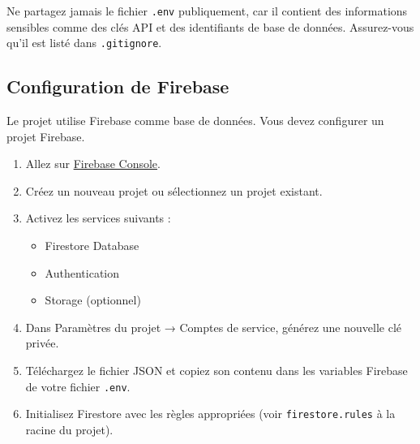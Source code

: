 \documentclass[12pt, a4paper]{article}
\begin{document}
\begin{warningbox}
Ne partagez jamais le fichier \texttt{.env} publiquement, car il contient des informations sensibles comme des clés API et des identifiants de base de données. Assurez-vous qu'il est listé dans \texttt{.gitignore}.
\end{warningbox}

\subsection{Configuration de Firebase}
\begin{stepbox}
Le projet utilise Firebase comme base de données. Vous devez configurer un projet Firebase.

\begin{enumerate}
  \item Allez sur \href{https://console.firebase.google.com/}{Firebase Console}.
  \item Créez un nouveau projet ou sélectionnez un projet existant.
  \item Activez les services suivants :
  \begin{itemize}
    \item Firestore Database
    \item Authentication
    \item Storage (optionnel)
  \end{itemize}
  \item Dans Paramètres du projet → Comptes de service, générez une nouvelle clé privée.
  \item Téléchargez le fichier JSON et copiez son contenu dans les variables Firebase de votre fichier \texttt{.env}.
  \item Initialisez Firestore avec les règles appropriées (voir \texttt{firestore.rules} à la racine du projet).
\end{enumerate}
\end{stepbox}
\end{document}
